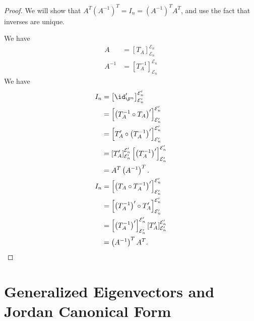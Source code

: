 \documentclass[10pt]{mypackage}
\begin{document}
\begin{proof}
  We will show that $A^{T} \left(A^{-1}\right)^{T} = I_n = \left(A^{-1}\right)^{T} A^T$, and use the fact that inverses are unique.\newline

  We have
  \begin{align*}
    A &= \left[T_A\right]_{\mathcal{E}_n}^{\mathcal{E}_n}\\
    A^{-1} &= \left[T_A^{-1}\right]_{\mathcal{E}_n}^{\mathcal{E}_n}
  \end{align*}
  We have
  \begin{align*}
    I_n &= \left[\id_{\F^n}'\right]_{\mathcal{E}_n'}^{\mathcal{E}_n'}\\
        &= \left[\left(T_A^{-1}\circ T_A\right)'\right]_{\mathcal{E}_n'}^{\mathcal{E}_n'}\\
        &= \left[T_A'\circ \left(T_A^{-1}\right)'\right]_{\mathcal{E}_n'}^{\mathcal{E}_n'}\\
        &= \left[T_A'\right]_{\mathcal{E}_n'}^{\mathcal{E}_n'}\left[\left(T_A^{-1}\right)'\right]_{\mathcal{E}_n'}^{\mathcal{E}_n'}\\
        &= A^T\left(A^{-1}\right)^T.\\
    I_n &= \left[\left(T_A\circ T_A^{-1}\right)'\right]_{\mathcal{E}_n'}^{\mathcal{E}_n'}\\
        &= \left[\left(T_A^{-1}\right)'\circ T_A'\right]_{\mathcal{E}_n'}^{\mathcal{E}_n'}\\
        &= \left[\left(T_A^{-1}\right)'\right]_{\mathcal{E}_n'}^{\mathcal{E}_n'}\left[T_A'\right]_{\mathcal{E}_n'}^{\mathcal{E}_n'}\\
        &= \left(A^{-1}\right)^{T}A^{T}.
  \end{align*}
\end{proof}
\section{Generalized Eigenvectors and Jordan Canonical Form}%
\end{document}
